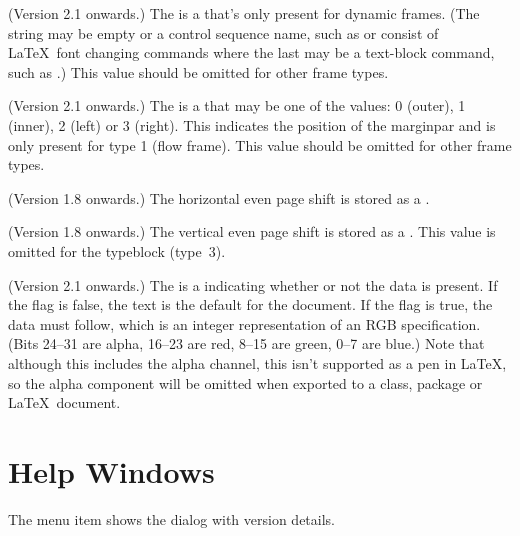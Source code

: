 \begin{numbered}
\item (Version 2.1 onwards.) The  is a
 that's only present for dynamic frames. (The string
may be empty or a control sequence name, such as  or 
consist of \LaTeX\ font changing commands where the last may be 
a text-block command, such as .)
This value should be omitted for other frame types.

\item (Version 2.1 onwards.) The  is a 
that may be one of the values: 0 (outer), 1 (inner), 2 (left) or 3
(right). This indicates the position of the marginpar and is only
present for type 1 (flow frame).
This value should be omitted for other frame types.

\item (Version 1.8 onwards.) The horizontal even page shift
 is stored as a .

\item (Version 1.8 onwards.) The vertical even page shift
 is stored as a . This value is
omitted for the \gls{typeblock} (type~3).

\item (Version 2.1 onwards.) The  is a
 indicating whether or not the  data is
present. If the flag is false, the text  is the default
for the document. If the flag is true, the  data must
follow, which is an integer representation of an RGB
 specification.  (Bits 24--31 are alpha, 16--23 are red,
8--15 are green, 0--7 are blue.) Note that although this includes
the alpha channel, this isn't supported as a pen  in
\LaTeX, so the alpha component will be omitted when exported to a class, package or
\LaTeX\ document.

\end{numbered}%

\chapter{Help Windows}
\label{sec:helpwindows}


The  menu item shows the 
dialog with version details.


